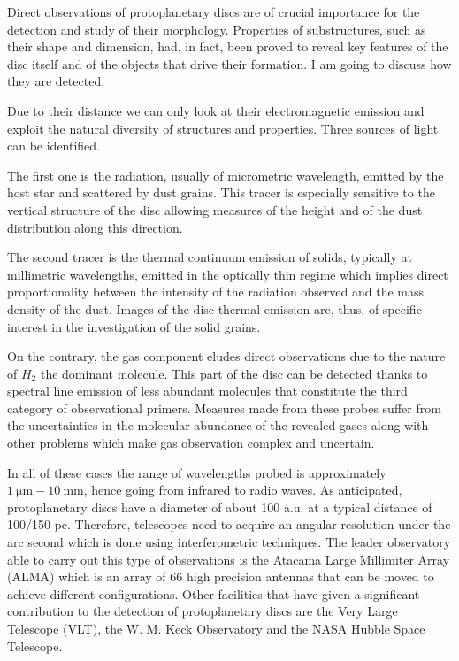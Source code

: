 \documentclass[a4paper,10pt]{report}
\begin{document}
Direct observations of protoplanetary discs are of crucial importance for the detection and study of their morphology.
Properties of substructures, such as their shape and dimension, had, in fact, 
been proved to reveal key features of the disc itself and
of the objects that drive their formation. I am going to discuss how they are detected.

Due to their distance we can only look at their electromagnetic emission
and exploit the natural diversity of structures and properties. 
Three sources of light can be identified.

The first one is the radiation, usually of micrometric wavelength, emitted by the host star and scattered by dust grains.
This tracer is especially sensitive to the vertical structure 
of the disc allowing measures of the height and of the dust distribution along this direction.

The second tracer is the thermal continuum emission of solids, typically at millimetric wavelengths,
emitted in the optically thin regime which implies direct proportionality between the intensity of the radiation observed and the
mass density of the dust. Images of the disc thermal emission are, thus, of specific interest in the investigation of the solid grains.

On the contrary, the gas component eludes direct observations due to the nature of $H_2$ the dominant molecule.
This part of the disc can be detected thanks to spectral line emission of less abundant molecules 
that constitute the third category of observational primers. Measures made from these probes suffer from
the uncertainties in the molecular abundance of the revealed gases along with other problems
which make gas observation complex and uncertain.

In all of these cases the range of wavelengths probed is approximately $\SI{1}{\micro\m} - \SI{10}{\mm}$, hence going from infrared to radio waves.
As anticipated, protoplanetary discs have a diameter of about 100 a.u. at a typical distance of 100/150 pc. Therefore, telescopes need to acquire an angular
resolution under the arc second which is done using interferometric techniques. The leader observatory able to carry out this type of observations is the Atacama Large Millimiter Array (ALMA)
which is an array of 66 high precision antennas that can be moved to achieve different configurations. 
Other facilities that have given a significant contribution to the detection of protoplanetary discs are the Very Large Telescope (VLT), the W. M. Keck Observatory and the NASA
Hubble Space Telescope.
\end{document}
